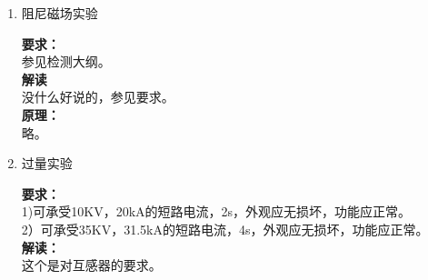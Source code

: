 \documentclass{article}
\begin{document}
\begin{CJK}{UTF8}{gbsn}
\begin{enumerate}
\item 阻尼磁场实验
	\par
	\textbf{要求：}\\
	参见检测大纲。\\
	\textbf{解读}\\
	没什么好说的，参见要求。\\
	\textbf{原理：}\\
	略。

\item 过量实验
	\par
	\textbf{要求：}\\
	1)可承受10KV，20kA的短路电流，2s，外观应无损坏，功能应正常。\\
	2）可承受35KV，31.5kA的短路电流，4s，外观应无损坏，功能应正常。\\
	\textbf{解读：}\\
	这个是对互感器的要求。


\end{enumerate}
\end{CJK}
\end{document}
